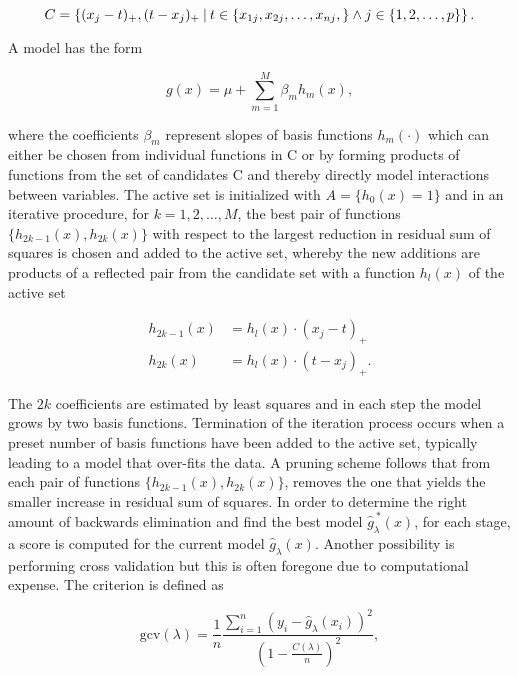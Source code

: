 \begin{equation}
  C = \left\{(x_j-t)_+, (t-x_j)_+ \:\vert\: t\in\{x_{1j}, x_{2j}, \dotsc, x_{nj}, \} \land j\in\{1, 2, \dotsc, p\} \right\}.
\end{equation}

A  model has the form

\begin{equation}
  g(x) = \mu + \sum_{m=1}^M \beta_m h_m(x),
\end{equation}

where the coefficients $\beta_m$ represent slopes of basis functions $h_m(\cdot)$ which can either be chosen from individual functions in C or by forming products of functions from the set of candidates C and thereby directly model interactions between variables. The active set is initialized with $A=\{h_0(x)=1\}$ and in an iterative procedure, for $k=1, 2, \dotsc, M$, the best pair of functions $\{h_{2k-1}(x), h_{2k}(x)\}$ with respect to the largest reduction in residual sum of squares is chosen and added to the active set, whereby the new additions are products of a reflected pair from the candidate set with a function $h_l(x)$ of the active set

\begin{subequations}
\begin{align}
  h_{2k-1}(x) &= h_l(x) \cdot (x_j-t)_+ \\
  h_{2k}(x) &= h_l(x) \cdot (t-x_j)_+.
\end{align}
\end{subequations}

The $2k$ coefficients are estimated by least squares and in each step the model grows by two basis functions. Termination of the iteration process occurs when a preset number of basis functions have been added to the active set, typically leading to a model that over-fits the data. A pruning scheme follows that from each pair of functions $\{h_{2k-1}(x), h_{2k}(x)\}$, removes the one that yields the smaller increase in residual sum of squares. In order to determine the right amount of backwards elimination and find the best model $\widehat{g}_\lambda^{\ *}(x)$, for each stage, a  score is computed for the current model $\widehat{g}_\lambda(x)$. Another possibility is performing cross validation but this is often foregone due to computational expense. The  criterion is defined as

\begin{equation}
  \text{gcv}(\lambda) = \frac{1}{n}\frac{\sum_{i=1}^n \left(y_i-\widehat{g}_\lambda(x_i)\right)^2}{\left(1-\frac{C(\lambda)}{n}\right)^2},
\end{equation}

